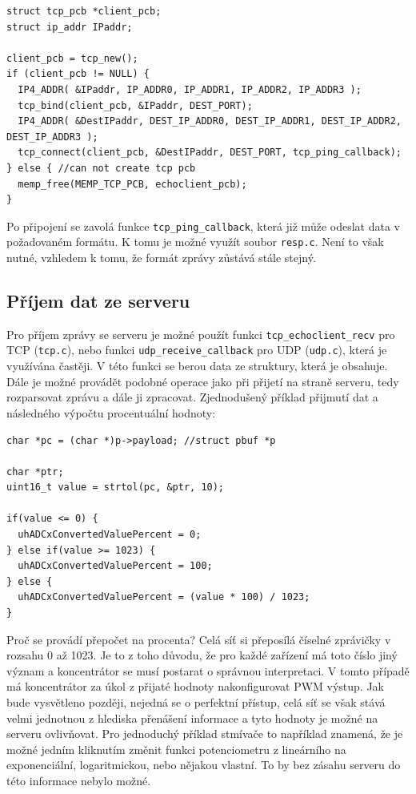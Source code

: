 \begin{verbatim}
struct tcp_pcb *client_pcb;
struct ip_addr IPaddr;

client_pcb = tcp_new();
if (client_pcb != NULL) {
  IP4_ADDR( &IPaddr, IP_ADDR0, IP_ADDR1, IP_ADDR2, IP_ADDR3 );
  tcp_bind(client_pcb, &IPaddr, DEST_PORT);
  IP4_ADDR( &DestIPaddr, DEST_IP_ADDR0, DEST_IP_ADDR1, DEST_IP_ADDR2, DEST_IP_ADDR3 );
  tcp_connect(client_pcb, &DestIPaddr, DEST_PORT, tcp_ping_callback);
} else { //can not create tcp pcb
  memp_free(MEMP_TCP_PCB, echoclient_pcb);
}
\end{verbatim}

Po připojení se zavolá funkce \texttt{tcp\_ping\_callback}, která již může odeslat data v požadovaném formátu. K tomu je možné využít soubor \texttt{resp.c}. Není to však nutné, vzhledem k tomu, že formát zprávy zůstává stále stejný.

\subsection{Příjem dat ze serveru}
Pro příjem zprávy se serveru je možné použít funkci \texttt{tcp\_echoclient\_recv} pro TCP (\texttt{tcp.c}), nebo funkci \texttt{udp\_receive\_callback} pro UDP (\texttt{udp.c}), která je využívána častěji. V této funkci se berou data ze struktury, která je obsahuje. Dále je možné provádět podobné operace jako při přijetí na straně serveru, tedy rozparsovat zprávu a dále ji zpracovat. Zjednodušený příklad přijmutí dat a následného výpočtu procentuální hodnoty:

\begin{verbatim}
char *pc = (char *)p->payload; //struct pbuf *p

char *ptr;
uint16_t value = strtol(pc, &ptr, 10);
	
if(value <= 0) {
  uhADCxConvertedValuePercent = 0;
} else if(value >= 1023) {
  uhADCxConvertedValuePercent = 100;
} else {
  uhADCxConvertedValuePercent = (value * 100) / 1023;
}
\end{verbatim}

Proč se provádí přepočet na procenta? Celá síť si přeposílá číselné zprávičky v rozsahu 0 až 1023. Je to z toho důvodu, že pro každé zařízení má toto číslo jiný význam a koncentrátor se musí postarat o správnou interpretaci. V tomto případě má koncentrátor za úkol z přijaté hodnoty nakonfigurovat PWM výstup. Jak bude vysvětleno později, nejedná se o perfektní přístup, celá síť se však stává velmi jednotnou z hlediska přenášení informace a tyto hodnoty je možné na serveru ovlivňovat. Pro jednoduchý příklad stmívače to například znamená, že je možné jedním kliknutím změnit funkci potenciometru z lineárního na exponenciální, logaritmickou, nebo nějakou vlastní. To by bez zásahu serveru do této informace nebylo možné.


